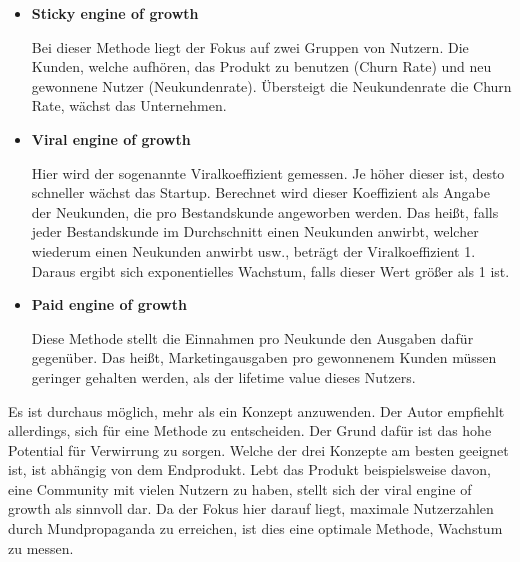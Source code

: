 \begin{itemize}
	\item \textbf{Sticky engine of growth}
	
	Bei dieser Methode liegt der Fokus auf zwei Gruppen von Nutzern. Die Kunden, welche aufhören, das Produkt zu benutzen (Churn Rate) und neu gewonnene Nutzer (Neukundenrate). Übersteigt die Neukundenrate die Churn Rate, wächst das Unternehmen. 
	\item \textbf{Viral engine of growth}
	
	Hier wird der sogenannte Viralkoeffizient gemessen. Je höher dieser ist, desto schneller wächst das Startup. Berechnet wird dieser Koeffizient als Angabe der Neukunden, die pro Bestandskunde angeworben werden. Das heißt, falls jeder Bestandskunde im Durchschnitt einen Neukunden anwirbt, welcher wiederum einen Neukunden anwirbt usw., beträgt der Viralkoeffizient 1. Daraus ergibt sich exponentielles Wachstum, falls dieser Wert größer als 1 ist.
	\item \textbf{Paid engine of growth}
	
	Diese Methode stellt die Einnahmen pro Neukunde den Ausgaben dafür gegenüber. Das heißt, Marketingausgaben pro gewonnenem Kunden müssen geringer gehalten werden, als der lifetime value dieses Nutzers.
\end{itemize}

Es ist durchaus möglich, mehr als ein Konzept anzuwenden. Der Autor empfiehlt allerdings, sich für eine Methode zu entscheiden. Der Grund dafür ist das hohe Potential für Verwirrung zu sorgen. Welche der drei Konzepte am besten geeignet ist, ist abhängig von dem Endprodukt. Lebt das Produkt beispielsweise davon, eine Community mit vielen Nutzern zu haben, stellt sich der viral engine of growth als sinnvoll dar. Da der Fokus hier darauf liegt, maximale Nutzerzahlen durch Mundpropaganda zu erreichen, ist dies eine optimale Methode, Wachstum zu messen.
\cite{TheLeanStartup}